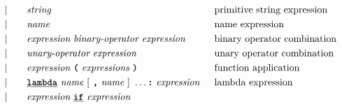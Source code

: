 \begin{alignat*}{9}
&&                       && |   &\quad &&  \textit{string}   && \textrm{primitive string expression}\\
&&                       && |   &\quad &&  \textit{name}   && \textrm{name expression}\\
&&                       && |   &\quad &&  \textit{expression} \  \textit{binary-operator} \ 
                                            \textit{expression} \qquad
                                                           && \textrm{binary operator combination}\\
&&                       && |   &\quad &&   \textit{unary-operator} \ 
                                            \textit{expression}
                                                           && \textrm{unary operator combination}\\
&&                       && |   &\quad &&   \textit{expression} \ 
                                            \textbf{\texttt{(}}\ \textit{expressions}\
                                            \textbf{\texttt{)}}
                                                           && \textrm{function application}\\
&&                       && |   &\quad &&   \textbf{\texttt{\underline{lambda}}} \ 
                                            \textit{name} \ 
                                                   [\ \textbf{\texttt{,}} \ \textit{name}\ ]\ \ldots
                                            \texttt{\textbf{:}}\ \textit{expression}
                                                           && \textrm{lambda expression}\\
&&                       && |   &\quad &&   \textit{expression} \ 
                                            \textbf{\texttt{\underline{if}}} \ \textit{expression} \ 

\end{alignat*}
